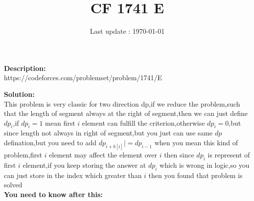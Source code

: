 \documentclass{article}
\begin{document}
\title{\textbf{CF 1741 E}}
\author{}
\date{Last update : \today}

\maketitle

\noindent \textbf{Description:}\\
https://codeforces.com/problemset/problem/1741/E

\noindent \textbf{Solution:}\\
This problem is very classic for two direction dp,if we reduce the problem,such that the length of segment always at the right of segment,then we can just define $dp_i$,if $dp_i=1$ mean first $i$ element can fulfill the criterion,otherwise $dp_i=0$,but since length not always in right of segment,but you just can use same $dp$ defination,but you need to add $dp_{i+b[i]}|=dp_{i-1}$ when you mean this kind of problem,first $i$ element may affect the element over $i$ then since $dp_i$ is represent of first $i$ element,if you keep storing the answer at $dp_i$ which is wrong in logic,so you can just store in the index which greater than $i$ then you found that problem is solved
\\
\noindent \textbf{You need to know after this:}\\
\end{document}
